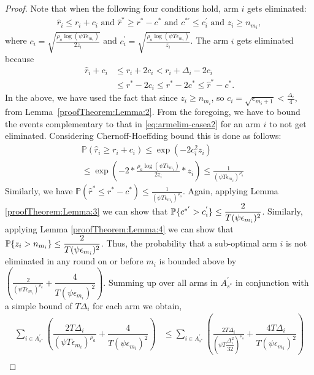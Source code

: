 \begin{proof}
Note that when the following four conditions hold, arm $i$ gets eliminated:
\begin{align}
\hat{r}_{i}  \le r_{i} + c_{i} \text{ and } 
 \hat{r}^{*}\geq  r^{*} - c^{*} \text{ and } c^{*'} \leq c_i^{'} \text{ and } z_i \geq n_{m_i}, \label{eq:armelim-casea2}
\end{align}
where  $c_{i} = \sqrt{\frac{\rho_{a}\log (\psi T\epsilon_{m_{i}})}{2 z_{i}}}$ and $c_{i}^{'} = \sqrt{\frac{\rho_{a}\log (\psi T\epsilon_{m_{i}})}{ z_{i}}}$. The arm $i$ gets eliminated because 
  \begin{align*}
\hat{r}_{i} +c_{i} & \leq r_{i} + 2c_{i} < r_{i} + \Delta_{i} - 2c_{i}\\
 &\leq r^{*} -2c_{i} \leq r^{*} - 2c^* \leq \hat{r}^{*} - c^{*}  .
  \end{align*}
In the above, we have used the fact that since $z_i\geq n_{m_i}$, so $ c_{i} = \sqrt{\epsilon_{m_{i}+1}} < \frac{\Delta_{i}}{4}$, from Lemma~\ref{proofTheorem:Lemma:2}. From the foregoing, we have to bound the events complementary to that in \eqref{eq:armelim-casea2} for an arm $i$ to not get eliminated. Considering Chernoff-Hoeffding bound this is done as follows:
  \begin{align*}
&\mathbb{P}\left(\hat{r}_{i}\geq r_{i} + c_{i}\right)\leq \exp(-2c_{i}^{2}z_{i})\\
&\leq \exp(-2 * \frac{\rho_{a}\log (\psi T\epsilon_{m_{i}})}{2 z_{i}}*z_{i})
\leq \frac{1}{(\psi T\epsilon_{m_{i}})^{\rho_{a}}}   
  \end{align*}
Similarly, we have $\mathbb{P}\left(\hat{r}^{*}\leq r^{*} - c^{*}\right)\leq \frac{1}{(\psi  T\epsilon_{m_{i}})^{\rho_{a}}}$. Again, applying Lemma \ref{proofTheorem:Lemma:3} we can show that  $\mathbb{P}\lbrace c^{*'} > c_i^{'} \rbrace \leq \dfrac{2}{T(\psi \epsilon_{m_i})^2}$. Similarly, applying Lemma \ref{proofTheorem:Lemma:4} we can show that $\mathbb{P}\lbrace z_i > n_{m_i} \rbrace \leq \dfrac{2}{T(\psi \epsilon_{m_i})^2}$. Thus, the probability that a sub-optimal arm $i$ is not eliminated in any round on or before $m_{i}$ is bounded above by $\left(\frac{2}{(\psi T\epsilon_{m_{i}})^{\rho_{a}}} + \dfrac{4}{T(\psi \epsilon_{m_i})^2}\right)$. Summing up over all arms in $A_{s^{*}}^{'}$ in conjunction with a simple bound of $T\Delta_{i}$ for each arm we obtain,
   \begin{align*}
\sum_{i\in A_{s^{*}}^{'}}\left(\dfrac{2T\Delta_{i}}{(\psi T\epsilon_{m_{i}})^{\rho_{a}}} + \dfrac{4}{T(\psi \epsilon_{m_i})^2}\right)&
\leq\sum_{i\in A_{s^{*}}^{'}}\left(\frac{2T\Delta_{i}}{(\psi T\dfrac{\Delta_{i}^{2}}{32})^{\rho_{a}}} +  \dfrac{4T\Delta_{i}}{T(\psi \epsilon_{m_i})^2}\right)\\

\end{align*}
\end{proof}
